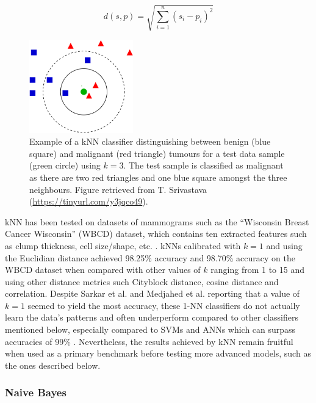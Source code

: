 \begin{equation}
\label{eq:euclidian-distance}
    d(s,p)=\sqrt{\sum_{i=1}^{n}(s_i-p_i)^2}
\end{equation}

\begin{figure}[h]
\centerline{\includegraphics[width=0.4\textwidth]{figures/litsurvey/knn.png}}
\caption{\label{fig:litsurvey-knn-example}Example of a kNN classifier distinguishing between benign (blue square) and malignant (red triangle) tumours for a test data sample (green circle) using $k=3$. The test sample is classified as malignant as there are two red triangles and one blue square amongst the three neighbours. Figure retrieved from T. Srivastava (\url{https://tinyurl.com/y3jqco49}).}
\end{figure}

kNN has been tested on datasets of mammograms such as the ``Wisconsin Breast Cancer Wisconsin'' (WBCD) dataset, which contains ten extracted features such as clump thickness, cell size/shape, etc. \citep{Wolberg1995}. kNNs calibrated with $k=1$ and using the Euclidian distance achieved 98.25\% accuracy \citep{Sarkar2000} and 98.70\% accuracy \citep{AhmedMedjahed2013} on the WBCD dataset when compared with other values of $k$ ranging from 1 to 15 and using other distance metrics such Cityblock distance, cosine distance and correlation.  Despite Sarkar et al. and Medjahed et al. reporting that a value of $k=1$ seemed to yield the most accuracy, these 1-NN classifiers do not actually learn the data's patterns and often underperform compared to other classifiers mentioned below, especially compared to SVMs and ANNs which can surpass accuracies of 99\% \citep{Yue2018, Asri2016, Montazeri2016}. Nevertheless, the results achieved by kNN remain fruitful when used as a primary benchmark before testing more advanced models, such as the ones described below.

\subsubsection{Naive Bayes}

